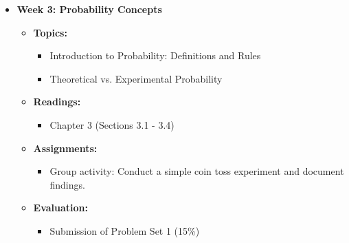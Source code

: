 \documentclass[aspectratio=169]{beamer}
\begin{document}
\begin{frame}[fragile]
\begin{itemize}
        \item \textbf{Week 3: Probability Concepts}
        \begin{itemize}
            \item \textbf{Topics:}
                \begin{itemize}
                    \item Introduction to Probability: Definitions and Rules
                    \item Theoretical vs. Experimental Probability
                \end{itemize}
            \item \textbf{Readings:}
                \begin{itemize}
                    \item Chapter 3 (Sections 3.1 - 3.4)
                \end{itemize}
            \item \textbf{Assignments:}
                \begin{itemize}
                    \item Group activity: Conduct a simple coin toss experiment and document findings.
                \end{itemize}
            \item \textbf{Evaluation:}
                \begin{itemize}
                    \item Submission of Problem Set 1 (15\%)
                \end{itemize}
        \end{itemize}
    \end{itemize}
\end{frame}
\end{document}
